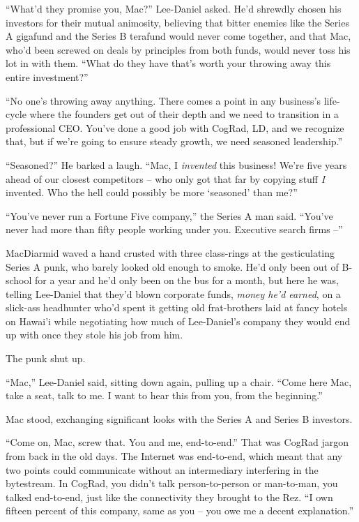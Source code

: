 “What'd they promise you, Mac?” Lee-Daniel asked. He'd shrewdly 
chosen his investors for their mutual animosity, believing that bitter 
enemies like the Series A gigafund and the Series B terafund would 
never come together, and that Mac, who'd been screwed on deals by 
principles from both funds, would never toss his lot in with them. 
“What do they have that's worth your throwing away this entire 
investment?”

“No one's throwing away anything. There comes a point in any 
business's life-cycle where the founders get out of their depth and we 
need to transition in a professional CEO. You've done a good job with 
CogRad, LD, and we recognize that, but if we're going to ensure steady 
growth, we need seasoned leadership.”

“Seasoned?” He barked a laugh. “Mac, I \emph{invented} this 
business! We're five years ahead of our closest competitors -- who only 
got that far by copying stuff \emph{I} invented. Who the hell could 
possibly be more `seasoned' than me?”

“You've never run a Fortune Five company,” the Series A man said. 
“You've never had more than fifty people working under you. Executive 
search firms --”

MacDiarmid waved a hand crusted with three class-rings at the 
gesticulating Series A punk, who barely looked old enough to smoke. 
He'd only been out of B-school for a year and he'd only been on the bus 
for a month, but here he was, telling Lee-Daniel that they'd blown 
corporate funds, \emph{money he'd earned}, on a slick-ass headhunter 
who'd spent it getting old frat-brothers laid at fancy hotels on 
Hawai'i while negotiating how much of Lee-Daniel's company they would 
end up with once they stole his job from him.

The punk shut up.

“Mac,” Lee-Daniel said, sitting down again, pulling up a chair. 
“Come here Mac, take a seat, talk to me. I want to hear this from 
you, from the beginning.”

Mac stood, exchanging significant looks with the Series A and Series B 
investors.

“Come on, Mac, screw that. You and me, end-to-end.” That was CogRad 
jargon from back in the old days. The Internet was end-to-end, which 
meant that any two points could communicate without an intermediary 
interfering in the bytestream. In CogRad, you didn't talk 
person-to-person or man-to-man, you talked end-to-end, just like the 
connectivity they brought to the Rez. “I own fifteen percent of this 
company, same as you -- you owe me a decent explanation.”

